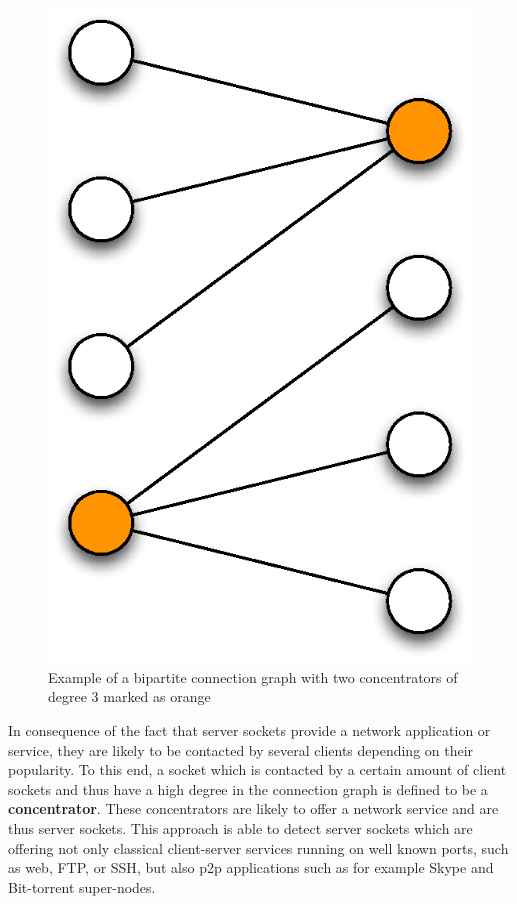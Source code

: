 \begin{figure}
	[h] \centering
	\includegraphics[width=\linewidth/3]{images/connection_graph.eps} \caption{Example of a bipartite connection graph with two concentrators of degree 3 marked as orange}
	\label{fig:bipartite_graph}
\end{figure}

In consequence of the fact that \glspl{server socket} provide a network
application or service, they are likely to be contacted by several clients
depending on their popularity. To this end, a socket which is contacted by a
certain amount of client sockets and thus have a high degree in the connection
graph is defined to be a \textbf{concentrator}. These concentrators are likely
to offer a network service and are thus \glspl{server socket}.
This approach is able to detect \glspl{server socket} which are offering not
only classical client-server services running on well known ports, such as web,
\gls{FTP}, or \gls{SSH}, but also \gls{p2p} applications such as for example
Skype and Bit-torrent super-nodes.

